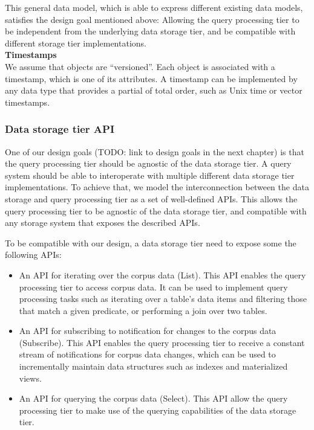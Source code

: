This general data model, which is able to express different existing data models, satisfies the design goal mentioned
above:
Allowing the query processing tier to be independent from the underlying data storage tier, and be compatible with
different storage tier implementations. \\

\noindent \textbf{Timestamps} \\
We assume that objects are ``versioned''.
Each object is associated with a timestamp, which is one of its attributes.
A timestamp can be implemented by any data type that provides a partial of total order,
such as Unix time or vector timestamps.


\subsubsection{Data storage tier API}
One of our design goals
(TODO: link to design goals in the next chapter)
is that the query processing tier should be agnostic of the data storage tier.
A query system should be able to interoperate with multiple different data storage tier implementations.
To achieve that, we model the interconnection between the data storage and query processing tier as a set of well-defined APIs.
This allows the query processing tier to be agnostic of the data storage tier, and compatible with any storage system
that exposes the described APIs.


To be compatible with our design, a data storage tier need to expose some the following APIs:
\begin{itemize}
  \item An API for iterating over the corpus data (List).
  This API enables the query processing tier to access corpus data.
  It can be used to implement query processing tasks such as iterating over a table's data items and filtering those that
  match a given predicate, or performing a join over two tables.
  \item An API for subscribing to notification for changes to the corpus data (Subscribe).
  This API enables the query processing tier to receive a constant stream of notifications for corpus data changes,
  which can be used to incrementally maintain data structures such as indexes and materialized views.
  \item An API for querying the corpus data (Select).
  This API allow the query processing tier to make use of the querying capabilities of the data storage tier.
\end{itemize}

